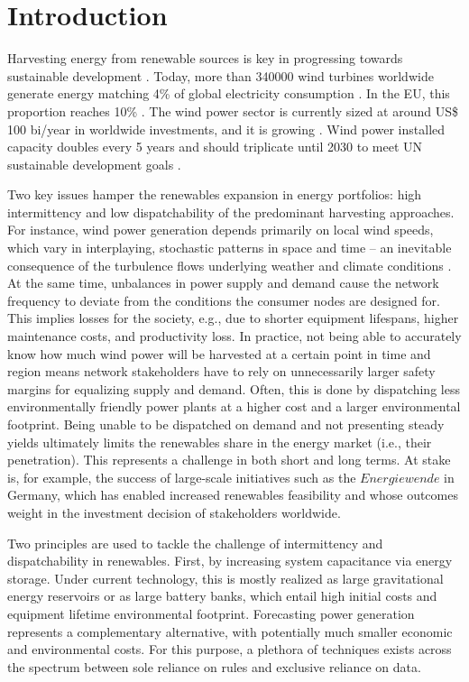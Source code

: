 \chapter{Introduction}
Harvesting energy from renewable sources is key in progressing towards sustainable development \cite{johansson2002energy}.
Today, more than 340000 wind turbines worldwide generate energy matching 4\% of global electricity consumption \cite{gwec2017numbers}.
In the EU, this proportion reaches 10\% \cite{gwec2017numbers}.
The wind power sector is currently sized at around US\$ 100 bi/year in worldwide investments, and it is growing \cite{update2017global}.
Wind power installed capacity doubles every 5 years and should triplicate until 2030 to meet UN sustainable development goals \cite{gwec2017numbers}.

Two key issues hamper the renewables expansion in energy portfolios: high intermittency and low dispatchability of the predominant harvesting approaches.
For instance, wind power generation depends primarily on local wind speeds, which vary in interplaying, stochastic patterns in space and time – an inevitable consequence of the turbulence flows underlying weather and climate conditions \cite{pope2001turbulent}.
At the same time, unbalances in power supply and demand cause the network frequency to deviate from the conditions the consumer nodes are designed for.
This implies losses for the society, e.g., due to shorter equipment lifespans, higher maintenance costs, and productivity loss.
In practice, not being able to accurately know how much wind power will be harvested at a certain point in time and region means network stakeholders have to rely on unnecessarily larger safety margins for equalizing supply and demand.
Often, this is done by dispatching less environmentally friendly power plants at a higher cost and a larger environmental footprint.
Being unable to be dispatched on demand and not presenting steady yields ultimately limits the renewables share in the energy market (i.e., their penetration).
This represents a challenge in both short and long terms.
At stake is, for example, the success of large-scale initiatives such as the $\textit{Energiewende}$ in Germany, which has enabled increased renewables feasibility and whose outcomes weight in the investment decision of stakeholders worldwide.

Two principles are used to tackle the challenge of intermittency and dispatchability in renewables.
First, by increasing system capacitance via energy storage.
Under current technology, this is mostly realized as large gravitational energy reservoirs or as large battery banks, which entail high initial costs and equipment lifetime environmental footprint.
Forecasting power generation represents a complementary alternative, with potentially much smaller economic and environmental costs.
For this purpose, a plethora of techniques exists across the spectrum between sole reliance on rules and exclusive reliance on data.

